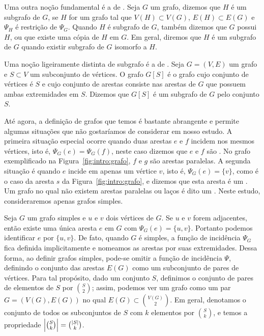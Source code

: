 Uma outra noção fundamental é a de . Seja $G$ um grafo, dizemos que $H$ é um subgrafo de $G$, se $H$ for um grafo tal que $V(H) \subset V(G)$, $E(H) \subset E(G)$ e $\Psi_H$ é restrição de $\Psi_G$. Quando $H$ é subgrafo de $G$, também dizemos que $G$ possui $H$, ou que existe uma cópia de $H$ em $G$. Em geral, diremos que $H$ é um subgrafo de $G$ quando existir subgrafo de $G$ isomorfo a $H$.

Uma noção ligeiramente distinta de subgrafo é a de . Seja $G = (V,E)$ um grafo e $S \subset V$ um subconjunto de vértices. O grafo $G[S]$ é o grafo cujo conjunto de vértices é $S$ e cujo conjunto de arestas consiste nas arestas de $G$ que possuem ambas extremidades em $S$. Dizemos que $G[S]$ é um subgrafo de $G$  pelo conjunto $S$.

Até agora, a definição de grafos que temos é bastante abrangente e permite algumas situações que não gostaríamos de considerar em nosso estudo. A primeira situação especial ocorre quando duas arestas $e$ e $f$ incidem nos mesmos vértices, isto é, $\Psi_G(e) = \Psi_G(f)$, neste caso dizemos que $e$ e $f$ são . No grafo exemplificado na Figura~\ref{fig:intro:grafo}, $f$ e $g$ são arestas paralelas.
A segunda situação é quando $e$ incide em apenas um vértice $v$, isto é, $\Psi_G(e) = \{v\}$, como é o caso da aresta $s$ da Figura~\ref{fig:intro:grafo}, e dizemos que esta aresta é um . Um grafo no qual não existem arestas paralelas ou laços é dito um . Neste estudo, consideraremos apenas grafos simples.

Seja $G$ um grafo simples e $u$ e $v$ dois vértices de $G$. Se $u$ e $v$ forem adjacentes, então existe uma única aresta $e$ em $G$ com $\Psi_G(e) = \{u,v\}$. Portanto podemos identificar $e$ por $\{u,v\}$. De fato, quando $G$ é simples, a função de incidência $\Psi_G$ fica definida implicitamente e nomeamos as arestas por suas extremidades. Dessa forma, ao definir grafos simples, pode-se omitir a função de incidência $\Psi$, definindo o conjunto das arestas $E(G)$ como um subconjunto de pares de vértices.
Para tal propósito, dado um conjunto $S$, definimos o conjunto de pares de elementos de $S$ por $\binom{S}{2}$; assim, podemos ver um grafo como um par $G = (V(G),E(G))$ no qual $E(G) \subset \binom{V(G)}{2}$. Em geral, denotamos o conjunto de todos os subconjuntos de $S$ com $k$ elementos por $\binom{S}{k}$, e temos a propriedade $\left | \binom{S}{k} \right | = \binom{\left | S \right |}{k}$.

